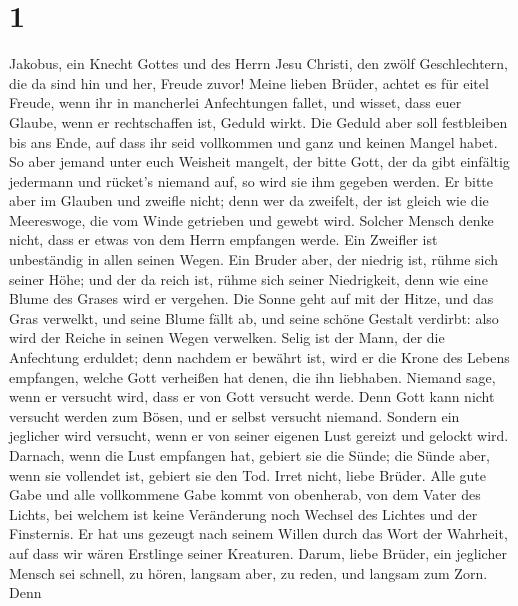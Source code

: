 \hypertarget{section}{%
\section{1}\label{section}}

 Jakobus, ein Knecht Gottes und des Herrn Jesu Christi, den
zwölf Geschlechtern, die da sind hin und her, Freude zuvor! 
Meine lieben Brüder, achtet es für eitel Freude, wenn ihr in mancherlei
Anfechtungen fallet,  und wisset, dass euer Glaube, wenn er
rechtschaffen ist, Geduld wirkt.  Die Geduld aber soll
festbleiben bis ans Ende, auf dass ihr seid vollkommen und ganz und
keinen Mangel habet.  So aber jemand unter euch Weisheit
mangelt, der bitte Gott, der da gibt einfältig jedermann und rücket's
niemand auf, so wird sie ihm gegeben werden.  Er bitte aber
im Glauben und zweifle nicht; denn wer da zweifelt, der ist gleich wie
die Meereswoge, die vom Winde getrieben und gewebt wird. 
Solcher Mensch denke nicht, dass er etwas von dem Herrn empfangen werde.
 Ein Zweifler ist unbeständig in allen seinen Wegen.
 Ein Bruder aber, der niedrig ist, rühme sich seiner Höhe;
 und der da reich ist, rühme sich seiner Niedrigkeit, denn
wie eine Blume des Grases wird er vergehen.  Die Sonne geht
auf mit der Hitze, und das Gras verwelkt, und seine Blume fällt ab, und
seine schöne Gestalt verdirbt: also wird der Reiche in seinen Wegen
verwelken.  Selig ist der Mann, der die Anfechtung
erduldet; denn nachdem er bewährt ist, wird er die Krone des Lebens
empfangen, welche Gott verheißen hat denen, die ihn liebhaben.
 Niemand sage, wenn er versucht wird, dass er von Gott
versucht werde. Denn Gott kann nicht versucht werden zum Bösen, und er
selbst versucht niemand.  Sondern ein jeglicher wird
versucht, wenn er von seiner eigenen Lust gereizt und gelockt wird.
 Darnach, wenn die Lust empfangen hat, gebiert sie die
Sünde; die Sünde aber, wenn sie vollendet ist, gebiert sie den Tod.
 Irret nicht, liebe Brüder.  Alle gute Gabe
und alle vollkommene Gabe kommt von obenherab, von dem Vater des Lichts,
bei welchem ist keine Veränderung noch Wechsel des Lichtes und der
Finsternis.  Er hat uns gezeugt nach seinem Willen durch
das Wort der Wahrheit, auf dass wir wären Erstlinge seiner Kreaturen.
 Darum, liebe Brüder, ein jeglicher Mensch sei schnell, zu
hören, langsam aber, zu reden, und langsam zum Zorn.  Denn
